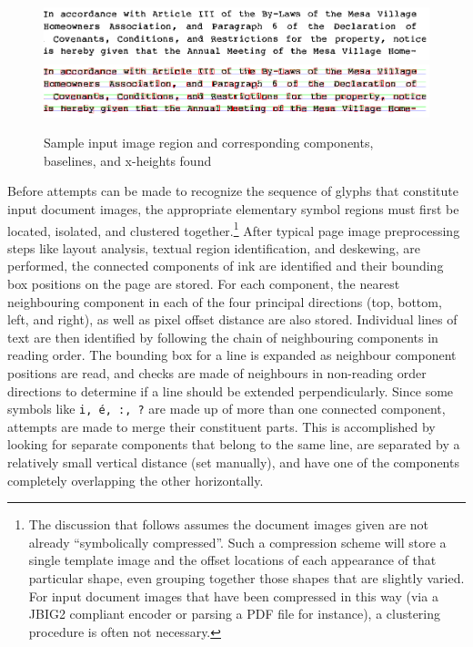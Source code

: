 \documentclass[times, 10pt,twocolumn]{article}
\begin{document}
\begin{figure}[ht]
  \centering
  \includegraphics[scale=.7]{figures/input_lines}
  \includegraphics[scale=.7]{figures/line_comps}
  \caption{Sample input image region and corresponding components, baselines,
           and x-heights found}
  \label{inimg_fig}
\end{figure}

\label{clustering_sec}

Before attempts can be made to recognize the sequence of glyphs that 
constitute input document images, the appropriate elementary symbol regions 
must first be located, isolated, and clustered together.\footnote{The
discussion that follows assumes the document images given are not
already ``symbolically compressed''. Such a compression scheme will
store a single template image and the offset locations of each
appearance of that particular shape, even grouping together
those shapes that are slightly varied.  For input document images that
have been compressed in this way (via a JBIG2 compliant encoder 
or parsing a PDF file for instance), a clustering procedure is often not necessary.}
After typical page image preprocessing steps like layout analysis, textual
region identification, and deskewing, are performed, the
connected components of ink are identified and their bounding box
positions on the page are stored.  For each component, the nearest neighbouring
component in each of the four principal directions (top, bottom, left, and
right), as well as pixel offset distance are also stored.  Individual lines
of text are then identified by following the chain of neighbouring components in
reading order.  The bounding box for a line is expanded as neighbour
component positions are read, and checks are made of neighbours in non-reading
order directions to determine if a line should be extended perpendicularly.
%
Since some symbols like {\tt i, \'{e}, :, ?} are made up of more than one
connected component, attempts are made to merge their constituent parts.  This
is accomplished by looking for separate components that belong to the same
line, are separated by a relatively small vertical distance (set manually), and
have one of the components completely overlapping the other horizontally.
\end{document}
